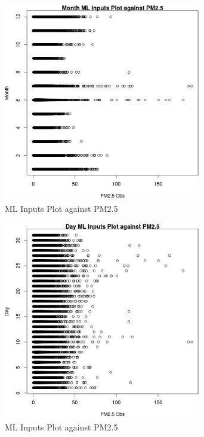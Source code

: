 \begin{figure} 
\centering  
\includegraphics[width=0.77\textwidth]{Code_Outputs/Report_ML_input_PM25_Step4_part_e_de_duplicated_aves_MonthvPM25_Obs.jpg} 
\caption{\label{fig:Report_ML_input_PM25_Step4_part_e_de_duplicated_avesMonthvPM25_Obs}ML Inputs Plot against PM2.5} 
\end{figure} 
 

\clearpage 

\begin{figure} 
\centering  
\includegraphics[width=0.77\textwidth]{Code_Outputs/Report_ML_input_PM25_Step4_part_e_de_duplicated_aves_DayvPM25_Obs.jpg} 
\caption{\label{fig:Report_ML_input_PM25_Step4_part_e_de_duplicated_avesDayvPM25_Obs}ML Inputs Plot against PM2.5} 
\end{figure} 
 

